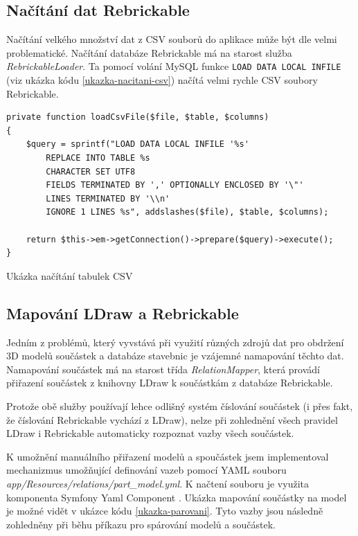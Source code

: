 \subsection{Načítání dat Rebrickable}\label{nacitani-rebrickable}
Načítání velkého množství dat z CSV souborů do aplikace může být dle \autocite{grok} velmi problematické. Načítání databáze Rebrickable má na starost služba \textit{RebrickableLoader}. Ta pomocí volání MySQL funkce \texttt{LOAD DATA LOCAL INFILE} (viz ukázka kódu \ref{ukazka-nacitani-csv}) načítá velmi rychle CSV soubory Rebrickable.

\begin{listing}[htbp]
        \begin{verbatim}
private function loadCsvFile($file, $table, $columns)
{
    $query = sprintf("LOAD DATA LOCAL INFILE '%s' 
        REPLACE INTO TABLE %s
        CHARACTER SET UTF8
        FIELDS TERMINATED BY ',' OPTIONALLY ENCLOSED BY '\"'
        LINES TERMINATED BY '\\n'
        IGNORE 1 LINES %s", addslashes($file), $table, $columns);

    return $this->em->getConnection()->prepare($query)->execute();
}
        \end{verbatim}
    \caption{Ukázka načítání tabulek CSV \label{ukazka-nacitani-csv}}
\end{listing}

\subsection{Mapování LDraw a Rebrickable}
Jedním z problémů, který vyvstává při využití různých zdrojů dat pro obdržení 3D modelů součástek a databáze stavebnic je vzájemné namapování těchto dat. Namapování součástek má na starost třída \textit{RelationMapper}, která provádí přiřazení součástek z knihovny LDraw k součástkám z databáze Rebrickable. 

Protože obě služby používají lehce odlišný systém číslování součástek (i přes fakt, že číslování Rebrickable vychází z LDraw), nelze při zohlednění všech pravidel LDraw \autocite{ldraw:numbering:faq} i Rebrickable \autocite{rebrickable:numbering:changes} automaticky rozpoznat vazby všech součástek.

K umožnění manuálního přiřazení modelů a spoučástek jsem implementoval mechanizmus umožňující definování vazeb pomocí \gls{YAML} souboru \textit{app/Resources/relations/part\_model.yml}. K načtení souboru je využita komponenta Symfony Yaml Component \autocite{symfony:yaml}. Ukázka mapování součástky na model je možné vidět v ukázce kódu \ref{ukazka-parovani}. Tyto vazby jsou následně zohledněny při běhu příkazu pro spárování modelů a součástek.

